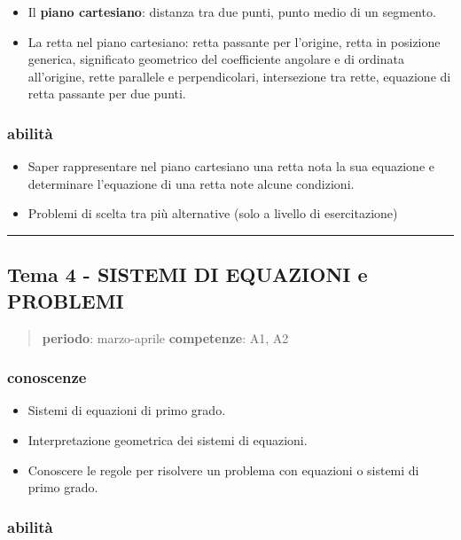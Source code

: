 \documentclass[12pt, a4paper]{exam}
\begin{document}
\begin{itemize}
\item
  Il \textbf{piano cartesiano}: distanza tra due punti, punto medio di
  un segmento.
\item
  La retta nel piano cartesiano: retta passante per l'origine, retta in
  posizione generica, significato geometrico del coefficiente angolare e
  di ordinata all'origine, rette parallele e perpendicolari,
  intersezione tra rette, equazione di retta passante per due punti.
\end{itemize}


\subsubsection*{abilità}

\begin{itemize}
\item
  Saper rappresentare nel piano cartesiano una retta nota la sua
  equazione e determinare l'equazione di una retta note alcune
  condizioni.
\item
  Problemi di scelta tra più alternative (solo a livello di
  esercitazione)
\end{itemize}

\bigskip
\hrule
\bigskip

\subsection*{Tema 4 - SISTEMI DI EQUAZIONI e PROBLEMI}

\begin{quote}
\textbf{periodo}: marzo-aprile \textbf{competenze}: A1, A2
\end{quote}


\subsubsection*{conoscenze}

\begin{itemize}
\item
  Sistemi di equazioni di primo grado.
\item
  Interpretazione geometrica dei sistemi di equazioni.
\item
  Conoscere le regole per risolvere un problema con equazioni o sistemi
  di primo grado.
\end{itemize}


\subsubsection*{abilità}
\end{document}
